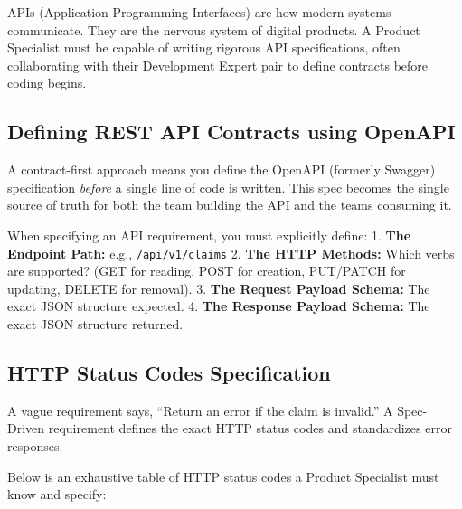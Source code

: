 \documentclass[
  11pt,
  openany,
  oneside]{book}
\begin{document}
APIs (Application Programming Interfaces) are how modern systems
communicate. They are the nervous system of digital products. A Product
Specialist must be capable of writing rigorous API specifications, often
collaborating with their Development Expert pair to define contracts
before coding begins.

\subsection{Defining REST API Contracts using
OpenAPI}\label{defining-rest-api-contracts-using-openapi}

A contract-first approach means you define the OpenAPI (formerly
Swagger) specification \emph{before} a single line of code is written.
This spec becomes the single source of truth for both the team building
the API and the teams consuming it.

When specifying an API requirement, you must explicitly define: 1.
\textbf{The Endpoint Path:} e.g., \texttt{/api/v1/claims} 2. \textbf{The
HTTP Methods:} Which verbs are supported? (GET for reading, POST for
creation, PUT/PATCH for updating, DELETE for removal). 3. \textbf{The
Request Payload Schema:} The exact JSON structure expected. 4.
\textbf{The Response Payload Schema:} The exact JSON structure returned.

\subsection{HTTP Status Codes
Specification}\label{http-status-codes-specification}

A vague requirement says, ``Return an error if the claim is invalid.'' A
Spec-Driven requirement defines the exact HTTP status codes and
standardizes error responses.

Below is an exhaustive table of HTTP status codes a Product Specialist
must know and specify:
\end{document}
